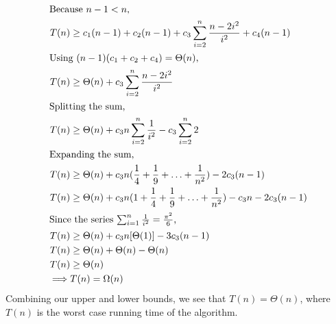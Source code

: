 \documentclass{report}
\begin{document}
\begin{enumerate}[label=(\alph*)]
\begin{align*}
		\intertext{Because $n-1 < n$,}
		T(n) &\geq c_1(n-1) + c_2(n-1) + c_3\sum_{i=2}^n\frac{n-2i^2}{i^2} + c_4(n-1)\\
		\intertext{Using $(n-1)(c_1 + c_2 + c_4) = \Theta(n)$,}
		T(n) &\geq \Theta(n) + c_3\sum_{i=2}^n\frac{n-2i^2}{i^2}\\
		\intertext{Splitting the sum,}
		T(n) &\geq \Theta(n) + c_3n\sum_{i=2}^n\frac{1}{i^2} - c_3\sum_{i=2}^n 2\\
		\intertext{Expanding the sum,}
		T(n) &\geq \Theta(n) + c_3n(\frac{1}{4} + \frac{1}{9} + \ldots + \frac{1}{n^2}) - 2c_3(n-1)\\
		T(n) &\geq \Theta(n) + c_3n(1 + \frac{1}{4} + \frac{1}{9} + \ldots + \frac{1}{n^2}) -c_3n - 2c_3(n-1)\\
		\intertext{Since the series $\sum_{i=1}^n \frac{1}{i^2} = \frac{\pi^2}{6}$,}
		T(n) &\geq \Theta(n) + c_3n[\Theta(1)] -3c_3(n-1)\\
		T(n) &\geq \Theta(n) + \Theta(n) - \Theta(n)\\
		T(n) &\geq \Theta(n)\\
		\implies &T(n) = \Omega(n)
	\end{align*}
	Combining our upper and lower bounds, we see that $T(n) = \Theta(n)$, where $T(n)$ is the worst case running time of the algorithm.
\end{enumerate}


\sol
\end{document}
